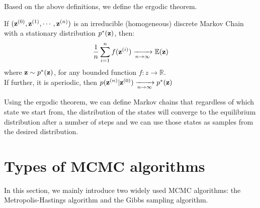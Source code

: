 Based on the above definitions, we define the ergodic theorem.
\begin{theorem}
If $({\bf z}^{(0)},{\bf z}^{(1)},\cdots,{\bf z}^{(n)})$ is an irreducible (homogeneous) discrete Markov Chain with a stationary
distribution $p^{*}({\bf z})$, then: 
$$\frac{1}{n}\sum_{i=1}^{n}f({\bf z}^{(i)}) \xrightarrow[n\rightarrow \infty]{} \mathbb{E}({\bf z})$$ 
where ${\bf z}\sim p^{*}({\bf z})$,
for any bounded function $f:z\rightarrow \mathbb{R}$. \\
If further, it is aperiodic, then $p({\bf z}^{(n)}|{\bf z}^{(0)})\xrightarrow[n\rightarrow \infty]{} p^{*}({\bf z})$
\end{theorem}
Using the ergodic theorem, we can define Markov chains that regardless of which state we start from, the distribution of the states will converge to the equilibrium distribution after
a number of steps and we can use those states as samples from the desired distribution.

\section{Types of MCMC algorithms}
In this section, we mainly introduce two widely used MCMC algorithms: the Metropolis-Hastings algorithm and the Gibbs sampling algorithm.
